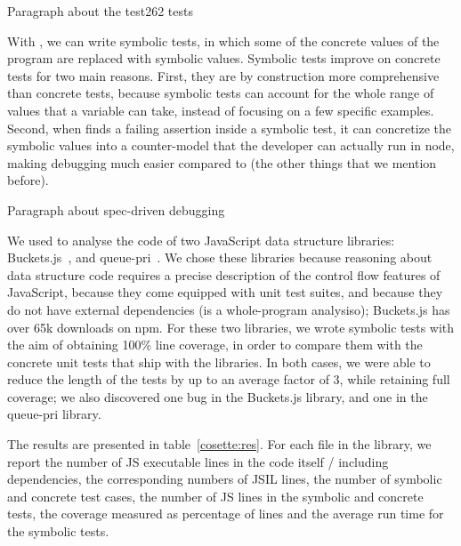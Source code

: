 
Paragraph about the test262 tests

With \cosette, we can write symbolic tests, in which some of the concrete values of the program are replaced with symbolic values.
Symbolic tests improve on concrete tests for two main reasons.
First, they are by construction more comprehensive than concrete tests, because symbolic tests can account for the whole range of values that a variable can take, instead of focusing on a few specific examples.
Second, when \cosette finds a failing assertion inside a symbolic test, it can concretize the symbolic values into a counter-model that the developer can actually run in node, making debugging much easier compared to (the other things that we mention before).

Paragraph about spec-driven debugging

We used \cosette to analyse the code of two JavaScript data structure libraries: Buckets.js~\cite{buckets}, and queue-pri~\cite{priq}.
We chose these libraries because reasoning about data structure code requires a precise description of the control flow features of JavaScript, because they come equipped with unit test suites, and because they do not have external dependencies (\cosette is a whole-program analysiso); Buckets.js has over 65k downloads on npm.
For these two libraries, we wrote symbolic tests with the aim of obtaining 100\% line coverage, in order to compare them with the concrete unit tests that ship with the libraries.
In both cases, we were able to reduce the length of the tests by up to an average factor of 3, while retaining full coverage; we also discovered one bug in the Buckets.js library, and one in the queue-pri library.



The results are presented in table~\ref{cosette:res}.
For each file in the library, we report the number of JS executable lines in the code itself / including dependencies, the corresponding numbers of JSIL lines, the number of symbolic and concrete test cases, the number of JS lines in the symbolic and concrete tests, the coverage measured as percentage of lines and the average \cosette run time for the symbolic tests.


